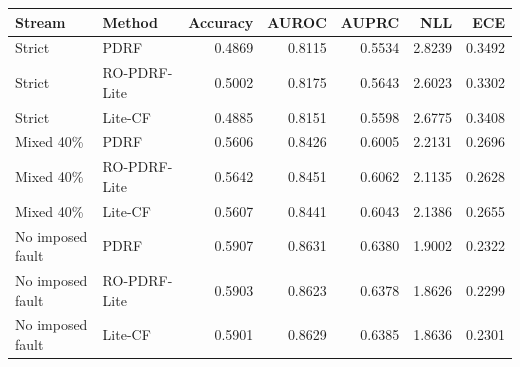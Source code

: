 \begin{tabular}{llrrrrr}
\toprule
Stream & Method & Accuracy & AUROC & AUPRC & NLL & ECE \\
\midrule
Strict & PDRF & 0.4869 & 0.8115 & 0.5534 & 2.8239 & 0.3492 \\
Strict & RO-PDRF-Lite & 0.5002 & 0.8175 & 0.5643 & 2.6023 & 0.3302 \\
Strict & Lite-CF & 0.4885 & 0.8151 & 0.5598 & 2.6775 & 0.3408 \\
Mixed 40\% & PDRF & 0.5606 & 0.8426 & 0.6005 & 2.2131 & 0.2696 \\
Mixed 40\% & RO-PDRF-Lite & 0.5642 & 0.8451 & 0.6062 & 2.1135 & 0.2628 \\
Mixed 40\% & Lite-CF & 0.5607 & 0.8441 & 0.6043 & 2.1386 & 0.2655 \\
No imposed fault & PDRF & 0.5907 & 0.8631 & 0.6380 & 1.9002 & 0.2322 \\
No imposed fault & RO-PDRF-Lite & 0.5903 & 0.8623 & 0.6378 & 1.8626 & 0.2299 \\
No imposed fault & Lite-CF & 0.5901 & 0.8629 & 0.6385 & 1.8636 & 0.2301 \\
\bottomrule
\end{tabular}
